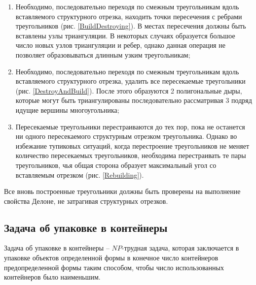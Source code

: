 \documentclass{fefu}
\begin{document}
\begin{enumerate}
    \item Необходимо, последовательно переходя по смежным треугольникам вдоль вставляемого структурного отрезка, находить 
    точки пересечения с ребрами треугольников (рис. \ref{BuildDestroying}). В местах пересечения должны быть вставлены узлы триангуляции. В некоторых 
    случаях образуется большое число новых узлов триангуляции и ребер, однако данная операция не позволяет образовываться 
    длинным узким треугольникам;
    \item Необходимо, последовательно переходя по смежным треугольникам вдоль вставляемого структурного отрезка, удалить 
    все пересекаемые треугольники (рис. \ref{DestroyAndBuild}). После этого образуются 2 полигональные дыры, которые могут быть триангулированы 
    последовательно рассматривая 3 подряд идущие вершины многоугольника;
    \item Пересекаемые треугольники перестраиваются до тех пор, пока не останется ни одного пересекаемого структурным 
    отрезком треугольника. Однако во избежание тупиковых ситуаций, когда перестроение треугольников не меняет количество 
    пересекаемых треугольников, необходима перестраивать те пары треугольников, чья общая сторона образует максимальный 
    угол со вставляемым отрезком (рис. \ref{Rebuilding}).
\end{enumerate}

Все вновь построенные треугольники должны быть проверены на выполнение свойства Делоне, не затрагивая структурных 
отрезков.
\subsection{Задача об упаковке в контейнеры}
Задача об упаковке в контейнеры -- $NP$-трудная задача, которая заключается в упаковке объектов определенной формы в
конечное число контейнеров предопределенной формы таким способом, чтобы число использованных контейнеров было
наименьшим.
\end{document}
